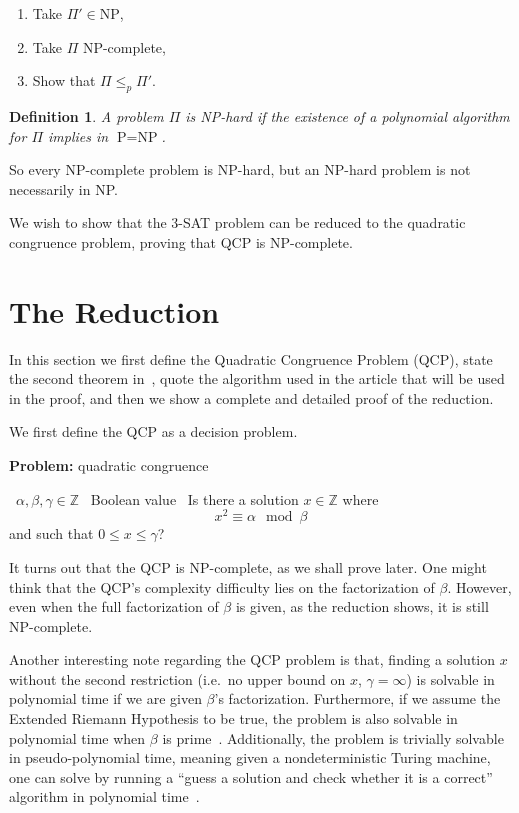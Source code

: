 \documentclass{amsart}
\theoremstyle{plain}
\newcounter{dummy-def}\numberwithin{dummy-def}{section}
\newtheorem{definition}[dummy-def]{Definition}
\newcounter{dummy-prop}\numberwithin{dummy-prop}{section}
\newcounter{dummy-corollary}\numberwithin{dummy-corollary}{section}
\newcounter{dummy-ex}\numberwithin{dummy-ex}{section}
\newcounter{dummy-eg}\numberwithin{dummy-eg}{section}
\newcommand{\p}{\text{P}}
\newcommand{\np}{\text{NP}}
\begin{document}
\begin{enumerate}
  \item Take $\Pi'\in \np$,
  \item Take $\Pi$ NP-complete,
  \item Show that $\Pi\leq_p\Pi'$.
\end{enumerate}

\begin{definition} A problem $\Pi$ is NP-hard if the existence of a polynomial algorithm for $\Pi$
  implies in $\p=\np$.
\end{definition}

So every NP-complete problem is NP-hard, but an NP-hard problem is not necessarily in NP\@.

We wish to show that the 3-SAT problem can be reduced to the quadratic congruence problem, proving
that QCP is NP-complete.

\section{The Reduction}

In this section we first define the Quadratic Congruence Problem (QCP), state the second theorem
in~\cite{qcp1}, quote the algorithm used in the article that will be used in the proof, and then we
show a complete and detailed proof of the reduction.

We first define the QCP as a decision problem.

\begin{algorithm}[h]
  \caption*{\textbf{Problem:} quadratic congruence}
  \begin{algorithmic}[1]
    \Require\, $\alpha,\beta,\gamma\in\mathbb{Z}$
    \Ensure\, Boolean value
    \Description\, Is there a solution $x\in\mathbb{Z}$ where
    \begin{equation*}
      x^2 \equiv\alpha\mod\beta
    \end{equation*}
    and such that $0\leq x\leq\gamma$?
  \end{algorithmic}
\end{algorithm}

It turns out that the QCP is NP-complete, as we shall prove later. One might think that the QCP's
complexity difficulty lies on the factorization of $\beta$. However, even when the full
factorization of $\beta$ is given, as the reduction shows, it is still NP-complete.

Another interesting note regarding the QCP problem is that, finding a solution $x$ without the
second restriction (i.e.\ no upper bound on $x$, $\gamma=\infty$) is solvable in polynomial time if
we are given $\beta$'s factorization. Furthermore, if we assume the Extended Riemann Hypothesis to
be true, the problem is also solvable in polynomial time when $\beta$ is
prime~\cite{garey-johnson}. Additionally, the problem is trivially solvable in pseudo-polynomial
time, meaning given a nondeterministic Turing machine, one can solve by running a ``guess a
solution and check whether it is a correct'' algorithm in polynomial time~\cite{qcp2}.
\end{document}

